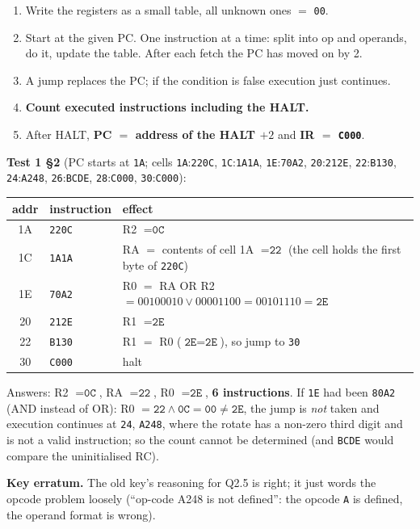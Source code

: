 \documentclass{fkt-notes}
\newcommand{\erratum}[1]{\par\noindent\textbf{Key erratum.} #1\par}
\newcommand{\hx}[1]{\texttt{#1}}
\begin{document}
\begin{rulebox}[title={Method: tracing a program}]
  \begin{enumerate}[nosep]
    \item Write the registers as a small table, all unknown ones $=$ \hx{00}.
    \item Start at the given PC. One instruction at a time: split into op and operands, do it,
          update the table. After each fetch the PC has moved on by 2.
    \item A jump replaces the PC; if the condition is false execution just continues.
    \item \textbf{Count executed instructions including the HALT.}
    \item After HALT, \textbf{PC $=$ address of the HALT $+2$} and \textbf{IR $=$ \hx{C000}}.
  \end{enumerate}
\end{rulebox}

\textbf{Test 1 \S2} (PC starts at \hx{1A}; cells \hx{1A}:\hx{220C}, \hx{1C}:\hx{1A1A}, \hx{1E}:\hx{70A2},
\hx{20}:\hx{212E}, \hx{22}:\hx{B130}, \hx{24}:\hx{A248}, \hx{26}:\hx{BCDE}, \hx{28}:\hx{C000}, \hx{30}:\hx{C000}):
\begin{center}
  \small
  \begin{tabular}{@{}cll@{}}
    \toprule
    addr & instruction & effect                                                                             \\
    \midrule
    1A   & \hx{220C}   & R2 $=\hx{0C}$                                                                      \\
    1C   & \hx{1A1A}   & RA $=$ contents of cell 1A $=\hx{22}$ (the cell holds the first byte of \hx{220C}) \\
    1E   & \hx{70A2}   & R0 $=$ RA OR R2 $=00100010\vee00001100=00101110=\hx{2E}$                           \\
    20   & \hx{212E}   & R1 $=\hx{2E}$                                                                      \\
    22   & \hx{B130}   & R1 $=$ R0 ($\hx{2E}=\hx{2E}$), so jump to \hx{30}                                  \\
    30   & \hx{C000}   & halt                                                                               \\
    \bottomrule
  \end{tabular}
\end{center}
Answers: R2 $=\hx{0C}$, RA $=\hx{22}$, R0 $=\hx{2E}$, \textbf{6 instructions}. If \hx{1E} had been
\hx{80A2} (AND instead of OR): R0 $=\hx{22}\wedge\hx{0C}=\hx{00}\ne\hx{2E}$, the jump is \emph{not} taken and
execution continues at \hx{24}, \hx{A248}, where the rotate has a non-zero third digit and is not a
valid instruction; so the count cannot be determined (and \hx{BCDE} would compare the uninitialised RC).
\erratum{The old key's reasoning for Q2.5 is right; it just words the opcode problem loosely
  (``op-code A248 is not defined'': the opcode \hx{A} is defined, the operand format is wrong).}
\end{document}
